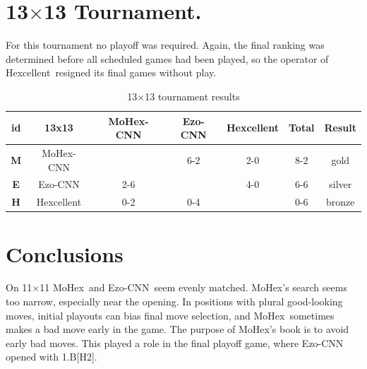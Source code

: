 \documentclass{IOS-Book-Article}
\def\Ec{\mbox{\sc Ezo-CNN}}
\def\Hent{\mbox{\sc Hexcellent}}
\def\Mx{\mbox{\sc MoHex}}
\def\Mc{\mbox{\sc MoHex-CNN}}
\begin{document}

\section{13$\times$13 Tournament.}
For this tournament no playoff was required.
Again, the final ranking was determined before
all scheduled games had been played,
so the operator of \Hent\ resigned its final games
without play.

\begin{table}
\begin{tabular}{|c|c|c|c|c|c|c|}
\hline {\bf id} & {\bf 13x13} &\Mc{} &\Ec{}  &\Hent{} 
                & {\bf Total} & {\bf Result} \\ 
\hline {\bf M} & \Mc{}         &      &  6-2  & 2-0  & 8-2   & gold \\
\hline {\bf E} & \Ec{}         &  2-6 &       & 4-0  & 6-6   & silver \\
\hline {\bf H} & \Hent{}       &  0-2 &  0-4  &      & 0-6   & bronze \\
\hline
\end{tabular}
\caption{13$\times$13 tournament results}
\label{tab:tour2}
\end{table}

\section{Conclusions}
On 11$\times$11 \Mx\ and \Ec\ seem evenly matched.
\Mx{}'s search seems too narrow, especially near the opening.
In positions with plural good-looking moves,
initial playouts can bias final move selection, and
\Mx\ sometimes makes a bad move early in the game.
The purpose of \Mx's book is to avoid early bad moves.
This played a role in the final playoff game, 
where \Ec{} opened with 1.B[H2].  
\end{document}
